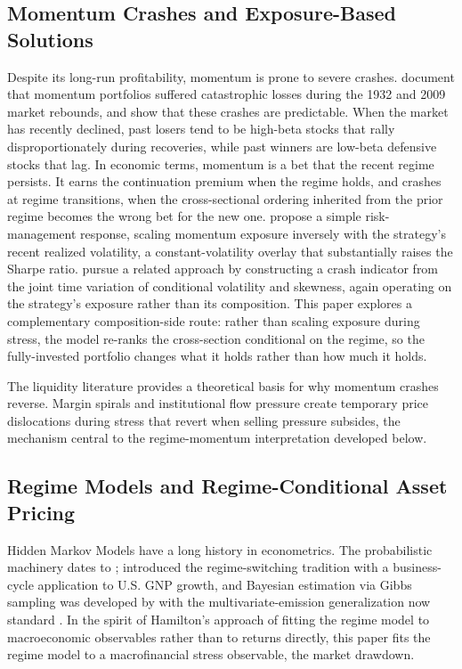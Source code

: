 \subsection{Momentum Crashes and Exposure-Based Solutions}\label{sec:lit_crashes}

Despite its long-run profitability, momentum is prone to severe crashes. \citet{DanielMoskowitz2016} document that momentum portfolios suffered catastrophic losses during the 1932 and 2009 market rebounds, and show that these crashes are predictable. When the market has recently declined, past losers tend to be high-beta stocks that rally disproportionately during recoveries, while past winners are low-beta defensive stocks that lag. In economic terms, momentum is a bet that the recent regime persists. It earns the continuation premium when the regime holds, and crashes at regime transitions, when the cross-sectional ordering inherited from the prior regime becomes the wrong bet for the new one. \citet{BarrosoSantaClara2015} propose a simple risk-management response, scaling momentum exposure inversely with the strategy's recent realized volatility, a constant-volatility overlay that substantially raises the Sharpe ratio. \citet{BianchiDePolisPetrella2022} pursue a related approach by constructing a crash indicator from the joint time variation of conditional volatility and skewness, again operating on the strategy's exposure rather than its composition. This paper explores a complementary composition-side route: rather than scaling exposure during stress, the model re-ranks the cross-section conditional on the regime, so the fully-invested portfolio changes what it holds rather than how much it holds.

The liquidity literature provides a theoretical basis for why momentum crashes reverse. Margin spirals \citep{BrunnermeierPedersen2009} and institutional flow pressure \citep{VayanosWoolley2013} create temporary price dislocations during stress that revert when selling pressure subsides, the mechanism central to the regime-momentum interpretation developed below.

\subsection{Regime Models and Regime-Conditional Asset Pricing}\label{sec:lit_hmm}

Hidden Markov Models have a long history in econometrics. The probabilistic machinery dates to \citet{Baum1970}; \citet{Hamilton1989} introduced the regime-switching tradition with a business-cycle application to U.S. GNP growth, and Bayesian estimation via Gibbs sampling was developed by \citet{AlbertChib1993} with the multivariate-emission generalization now standard \citep{FruhwirthSchnatter2006}. In the spirit of Hamilton's approach of fitting the regime model to macroeconomic observables rather than to returns directly, this paper fits the regime model to a macrofinancial stress observable, the market drawdown.


